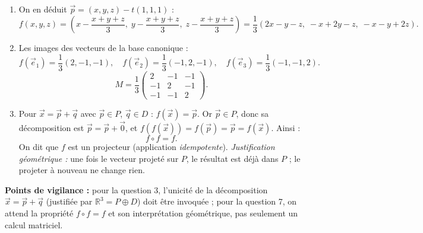 \documentclass[11pt]{article}
\newcommand{\cle}[1]{{\popxbold\color{popdark}#1}}
\begin{document}
\begin{corrige}
\begin{enumerate}
\item On en déduit $\vec{p} = (x, y, z) - t(1, 1, 1)$ :
\[ f(x, y, z) = \left( x - \frac{x+y+z}{3}, \; y - \frac{x+y+z}{3}, \; z - \frac{x+y+z}{3} \right) = \frac{1}{3}\left( 2x - y - z, \; -x + 2y - z, \; -x - y + 2z \right). \]
\item Les images des vecteurs de la base canonique :
\[ f(\vec{e}_1) = \frac{1}{3}(2, -1, -1), \quad f(\vec{e}_2) = \frac{1}{3}(-1, 2, -1), \quad f(\vec{e}_3) = \frac{1}{3}(-1, -1, 2). \]
\[ M = \frac{1}{3}\begin{pmatrix} 2 & -1 & -1 \\ -1 & 2 & -1 \\ -1 & -1 & 2 \end{pmatrix}. \]
\item Pour $\vec{x} = \vec{p} + \vec{q}$ avec $\vec{p} \in P$, $\vec{q} \in D$ : $f(\vec{x}) = \vec{p}$. Or $\vec{p} \in P$, donc sa décomposition est $\vec{p} = \vec{p} + \vec{0}$, et $f(f(\vec{x})) = f(\vec{p}) = \vec{p} = f(\vec{x})$. Ainsi :
\[ f \circ f = f. \]
On dit que $f$ est un \cle{projecteur} (application \emph{idempotente}). \emph{Justification géométrique :} une fois le vecteur projeté sur $P$, le résultat est déjà dans $P$ ; le projeter à nouveau ne change rien.
\end{enumerate}

\textbf{Points de vigilance :} pour la question 3, l'unicité de la décomposition $\vec{x} = \vec{p} + \vec{q}$ (justifiée par $\mathbb{R}^3 = P \oplus D$) doit être invoquée ; pour la question 7, on attend la propriété $f \circ f = f$ et son interprétation géométrique, pas seulement un calcul matriciel.
\end{corrige}
\end{document}
